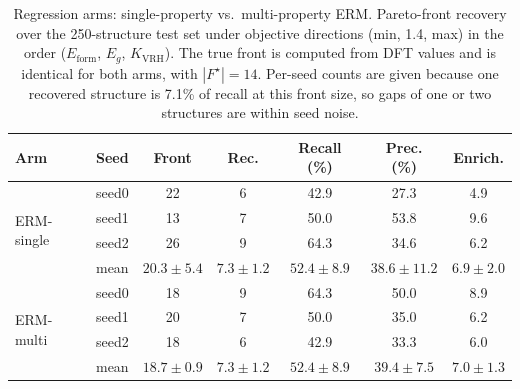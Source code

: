 \begin{table}[htbp]
\renewcommand{\arraystretch}{1.2}
\setlength{\tabcolsep}{4pt}
\caption{Regression arms: single-property vs.\ multi-property ERM. Pareto-front recovery over the 250-structure test set under objective directions (min, 1.4, max) in the order ($E_\mathrm{form}$, $E_g$, $K_\mathrm{VRH}$). The true front is computed from DFT values and is identical for both arms, with $|F^\star|{=}14$. Per-seed counts are given because one recovered structure is 7.1\% of recall at this front size, so gaps of one or two structures are within seed noise.}
\label{tab:pareto_arms_erm}
\centering
\footnotesize
\begin{tabular}{@{}llccccc@{}}
\hline\hline
\textbf{Arm} & \textbf{Seed} & \textbf{Front} & \textbf{Rec.} & \textbf{Recall (\%)} & \textbf{Prec. (\%)} & \textbf{Enrich.} \\
\hline
\multirow{4}{*}{ERM-single}
  & seed0 & 22 & 6 & 42.9 & 27.3 & 4.9 \\
  & seed1 & 13 & 7 & 50.0 & 53.8 & 9.6 \\
  & seed2 & 26 & 9 & 64.3 & 34.6 & 6.2 \\
  & mean & $20.3 \pm 5.4$ & $7.3 \pm 1.2$ & $52.4 \pm 8.9$ & $38.6 \pm 11.2$ & $6.9 \pm 2.0$ \\
\hline
\multirow{4}{*}{ERM-multi}
  & seed0 & 18 & 9 & 64.3 & 50.0 & 8.9 \\
  & seed1 & 20 & 7 & 50.0 & 35.0 & 6.2 \\
  & seed2 & 18 & 6 & 42.9 & 33.3 & 6.0 \\
  & mean & $18.7 \pm 0.9$ & $7.3 \pm 1.2$ & $52.4 \pm 8.9$ & $39.4 \pm 7.5$ & $7.0 \pm 1.3$ \\
\hline\hline
\end{tabular}
\end{table}
